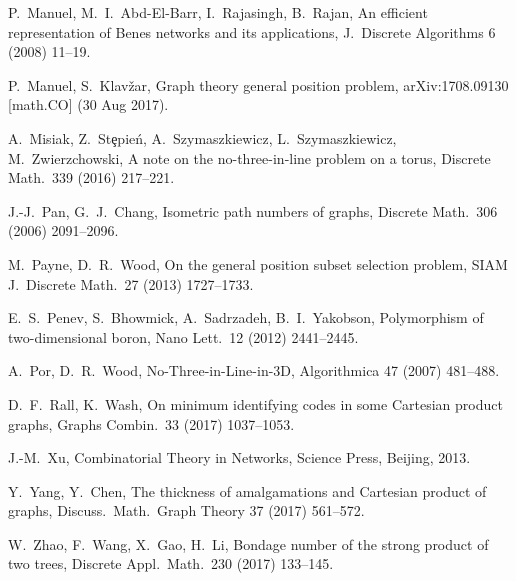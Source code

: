 \documentclass[12pt]{article}
\begin{document}
\begin{thebibliography}{99}
  P.~Manuel, M.~I.~Abd-El-Barr, I.~Rajasingh, B.~Rajan, 
  An efficient representation of Benes networks and its applications, 
  J.\ Discrete Algorithms 6 (2008) 11--19.

  P.~Manuel, S.~Klav\v{z}ar,
  Graph theory general position problem, 
  arXiv:1708.09130 [math.CO] (30 Aug 2017).

  A.~Misiak, Z.~Stȩpie\'n, A.~Szymaszkiewicz, L.~Szymaszkiewicz, M.~Zwierzchowski, 
  A note on the no-three-in-line problem on a torus,
  Discrete Math.\ 339 (2016) 217--221. 

  J.-J.~Pan, G.~J.~Chang, 
  Isometric path numbers of graphs,
  Discrete Math.\ 306 (2006) 2091--2096. 

  M.~Payne, D.~R.~Wood,
  On the general position subset selection problem, 
  SIAM J.\ Discrete Math.\ 27 (2013) 1727--1733.

  E.~S.~Penev, S.~Bhowmick, A.~Sadrzadeh, B.~I.~Yakobson,
  Polymorphism of two-dimensional boron,
  Nano Lett.\ 12 (2012) 2441--2445.
  
  A.~Por, D.~R.~Wood, 
  No-Three-in-Line-in-3D, 
  Algorithmica 47 (2007) 481--488.

  D.~F.~Rall, K.~Wash, 
  On minimum identifying codes in some Cartesian product graphs,
  Graphs Combin.\ 33 (2017) 1037--1053. 
  
  J.-M.~Xu, 
  Combinatorial Theory in Networks,
  Science Press, Beijing, 2013. 

  Y.~Yang, Y.~Chen, 
  The thickness of amalgamations and Cartesian product of graphs,
  Discuss.\ Math.\ Graph Theory 37 (2017) 561--572. 
  
  W.~Zhao, F.~Wang, X.~Gao, H.~Li, 
  Bondage number of the strong product of two trees,
  Discrete Appl.\ Math.\ 230 (2017) 133--145. 
\end{thebibliography}
\end{document}
